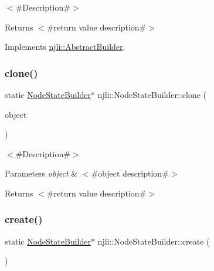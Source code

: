 $<$\#\+Description\#$>$

\begin{DoxyReturn}{Returns}
$<$\#return value description\#$>$ 
\end{DoxyReturn}


Implements \mbox{\hyperlink{classnjli_1_1_abstract_builder_aa1d220053e182c37b31b427499c6eacf}{njli\+::\+Abstract\+Builder}}.

\mbox{\label{classnjli_1_1_node_state_builder_a5f79a27baf7673246dfa24f7638f80a3}} 
\subsubsection{\texorpdfstring{clone()}{clone()}}
{\footnotesize\ttfamily static \mbox{\hyperlink{classnjli_1_1_node_state_builder}{Node\+State\+Builder}}$\ast$ njli\+::\+Node\+State\+Builder\+::clone (\begin{DoxyParamCaption}\item[{const \mbox{\hyperlink{classnjli_1_1_node_state_builder}{Node\+State\+Builder}} \&}]{object }\end{DoxyParamCaption})\hspace{0.3cm}{\ttfamily [static]}}

$<$\#\+Description\#$>$


\begin{DoxyParams}{Parameters}
{\em object} & $<$\#object description\#$>$\\
\hline
\end{DoxyParams}
\begin{DoxyReturn}{Returns}
$<$\#return value description\#$>$ 
\end{DoxyReturn}
\mbox{\label{classnjli_1_1_node_state_builder_a928c7c469900b4b2246bbd8fcd0d5762}} 
\subsubsection{\texorpdfstring{create()}{create()}}
{\footnotesize\ttfamily static \mbox{\hyperlink{classnjli_1_1_node_state_builder}{Node\+State\+Builder}}$\ast$ njli\+::\+Node\+State\+Builder\+::create (\begin{DoxyParamCaption}{ }\end{DoxyParamCaption})\hspace{0.3cm}{\ttfamily [static]}}

